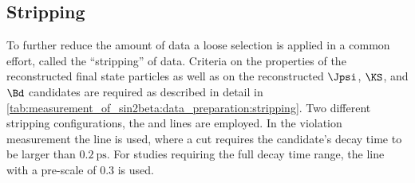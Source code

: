 \subsection{Stripping}
\label{sec:measurement_of_sin2beta:data_preparation:stripping}

To further reduce the amount of data a loose selection is applied in a common
effort, called the \enquote{stripping} of data. Criteria on the properties of
the reconstructed final state particles as well as on the reconstructed $\Jpsi$,
$\KS$, and $\Bd$ candidates are required as described in detail in 
\cref{tab:measurement_of_sin2beta:data_preparation:stripping}. Two different
stripping configurations, the \StrippingDetached and \StrippingPrescaled lines
are employed. In the \CP violation measurement the \StrippingDetached line is
used, where a cut requires the \Bd candidate's decay time to be larger than
$\SI{0.2}{\pico\second}$. For studies requiring the full decay time range, the
\StrippingPrescaled line with a pre-scale of $\num{0.3}$ is used.


